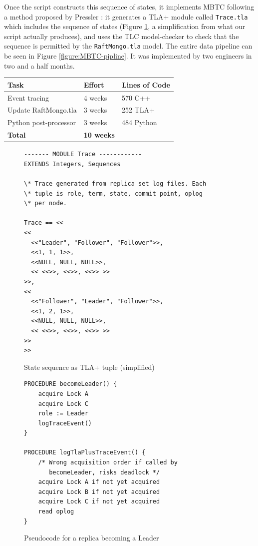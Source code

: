 \documentclass{vldb}
\begin{document}
Once the script constructs this sequence of states, it implements MBTC following a method proposed by Pressler \cite{Pressler18VerifyingSoftwareTracesTLAPlus}: it generates a TLA+ module called \texttt{Trace.tla} which includes the sequence of states (Figure \ref{fig:state-sequence}, a simplification from what our script actually produces), and uses the TLC model-checker to check that the sequence is permitted by the \texttt{RaftMongo.tla} model. The entire data pipeline can be seen in Figure \ref{figure:MBTC-pipline}. 
It was implemented by two engineers in two and a half months.

\begin{center}
\begin{tabular}{ | m{11em} | m{5em}| m{6em} | } 
\hline
Task & Effort & Lines of Code \\  
\hline
Event tracing & 4 weeks & 570 C++ \\ 
Update RaftMongo.tla & 3 weeks & 252 TLA+\\ 
Python post-processor & 3 weeks & 484 Python \\ 
\textbf{Total} & \textbf{10 weeks} & \\
\hline
\end{tabular}
\end{center}


\begin{figure}
\begin{verbatim}
------- MODULE Trace ------------
EXTENDS Integers, Sequences

\* Trace generated from replica set log files. Each
\* tuple is role, term, state, commit point, oplog
\* per node.

Trace == <<
<<
  <<"Leader", "Follower", "Follower">>,
  <<1, 1, 1>>,
  <<NULL, NULL, NULL>>,
  << <<>>, <<>>, <<>> >>
>>,
<<
  <<"Follower", "Leader", "Follower">>,
  <<1, 2, 1>>,
  <<NULL, NULL, NULL>>,
  << <<>>, <<>>, <<>> >>
>>
>>
\end{verbatim}
\caption{State sequence as TLA+ tuple (simplified)}
\label{fig:state-sequence}
\end{figure}

\begin{figure}
\begin{verbatim}
PROCEDURE becomeLeader() {
    acquire Lock A
    acquire Lock C
    role := Leader
    logTraceEvent()
}

PROCEDURE logTlaPlusTraceEvent() {
    /* Wrong acquisition order if called by
       becomeLeader, risks deadlock */
    acquire Lock A if not yet acquired
    acquire Lock B if not yet acquired
    acquire Lock C if not yet acquired
    read oplog
}
\end{verbatim}
\caption{Pseudocode for a replica becoming a Leader}
\label{fig:logTlaPlusTraceEvent}
\end{figure}
\end{document}
